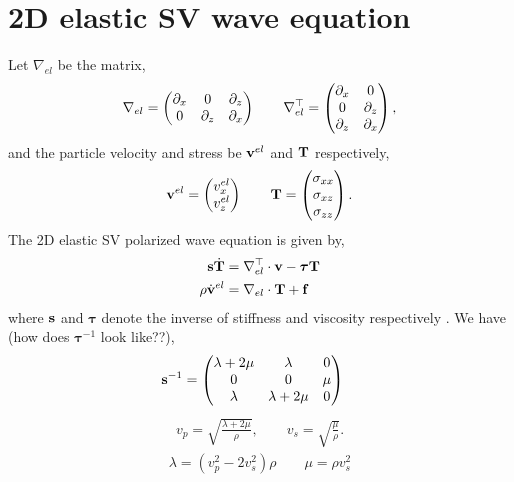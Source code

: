 \documentclass[a4paper,12pt]{article}
\begin{document}
\section*{2D elastic SV wave equation}
Let $\nabla_{el}$ be the matrix,
\begin{align}
\nabla_{el} = 
\begin{pmatrix} 
\partial_x & 0 & \partial_z \cr 
0 & \partial_z & \partial_x 
\end{pmatrix} 
%
\hspace{2em}
%
\nabla_{el}^{\top} = 
%
\begin{pmatrix} 
\partial_x & 0 \cr 
 0 & \partial_z \cr
\partial_z & \partial_x
\end{pmatrix},
\end{align}
%
and the particle velocity and stress be ${\bf v}^{el}$ and ${\bf T}$ respectively,
%
\begin{align}
{\bf v}^{el} = 
\begin{pmatrix} 
v^{el}_x \cr 
v^{el}_z 
\end{pmatrix} 
%
\hspace{2em}
%
{\bf T} = 
%
\begin{pmatrix} 
\sigma_{xx} \cr 
\sigma_{xz} \cr
\sigma_{zz}
\end{pmatrix}.
\end{align}
The 2D elastic SV polarized wave equation is given by,
\begin{align}
{\bf s}\dot{{\bf T}} &= \nabla_{el}^{\top} \cdot {\bf v} - \boldsymbol{\tau}{\bf T}\\
\rho\dot{{\bf v}}^{el} &= \nabla_{el}\cdot{\bf T} + {\bf f}
\end{align}
%
where ${\bf s}$ and $\boldsymbol{\tau}$ denote the inverse of stiffness and viscosity respectively \cite[][]{carcione1995acoustic}. We have (how does $\boldsymbol{\tau}^{-1}$ look like??),
\begin{align}
{\bf s}^{-1}&=
\begin{pmatrix} 
\lambda+2\mu & \lambda & 0\cr 
0 & 0 & \mu \cr
\lambda & \lambda+2\mu & 0
\end{pmatrix}
\end{align}
\begin{align}
v_p = \sqrt{\frac{\lambda+2\mu}{\rho}} , \hspace{2em} v_s=\sqrt{\frac{\mu}{\rho}}.
\end{align}
\begin{align}
\lambda=(v_p^2 - 2v_s^2)\rho \hspace{2em} \mu=\rho v_s^2
\end{align}
\end{document}
